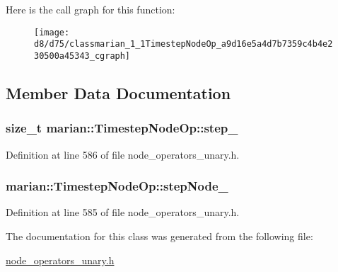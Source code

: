 Here is the call graph for this function\+:
\nopagebreak
\begin{figure}[H]
\begin{center}
\leavevmode
\texttt{[image: d8/d75/classmarian\_1\_1TimestepNodeOp\_a9d16e5a4d7b7359c4b4e230500a45343\_cgraph]}
\end{center}
\end{figure}




\subsection{Member Data Documentation}
\subsubsection[{\texorpdfstring{step\+\_\+}{step_}}]{\setlength{\rightskip}{0pt plus 5cm}size\+\_\+t marian\+::\+Timestep\+Node\+Op\+::step\+\_\+\hspace{0.3cm}{\ttfamily [private]}}\hypertarget{classmarian_1_1TimestepNodeOp_a2d925edb9c3a91f3621bb3eec9abb089}{}\label{classmarian_1_1TimestepNodeOp_a2d925edb9c3a91f3621bb3eec9abb089}


Definition at line 586 of file node\+\_\+operators\+\_\+unary.\+h.

\subsubsection[{\texorpdfstring{step\+Node\+\_\+}{stepNode_}}]{ marian\+::\+Timestep\+Node\+Op\+::step\+Node\+\_\+\hspace{0.3cm}{\ttfamily [private]}}\hypertarget{classmarian_1_1TimestepNodeOp_ae2de782a41318926105ad31179d3436f}{}\label{classmarian_1_1TimestepNodeOp_ae2de782a41318926105ad31179d3436f}


Definition at line 585 of file node\+\_\+operators\+\_\+unary.\+h.



The documentation for this class was generated from the following file\+:\begin{DoxyCompactItemize}
\item 
\hyperlink{node__operators__unary_8h}{node\+\_\+operators\+\_\+unary.\+h}\end{DoxyCompactItemize}

